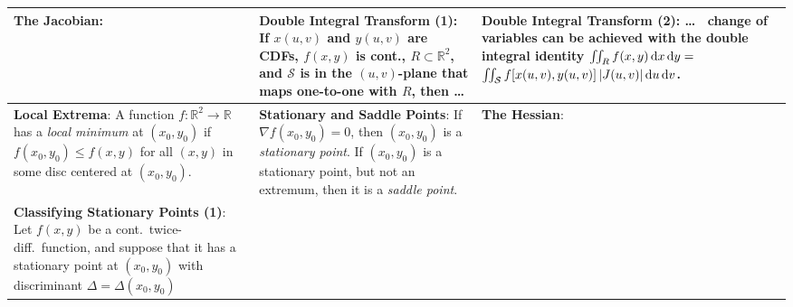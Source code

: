 \begin{tabular}{|m{.31\linewidth}|m{.31\linewidth}|m{.31\linewidth}|}
\hline

\textbf{The Jacobian}:
    \smash{$
        J \coloneqq \det \left(
            \begin{array}{cc}
                \partial x/\partial u &
                \partial x/\partial v \\
                \partial y/\partial u &
                \partial y/\partial v
            \end{array}
        \right)
    $} &

\textbf{Double Integral Transform (1)}:
    If
        $ x(u, v) $ and
        $ y(u, v) $ are CDFs,
        $ f(x, y) $ is cont.,
        $ R \subset \mathbb{R}^2 $, and
        $ \mathcal{S} $ is in the $ (u, v) $-plane that maps one-to-one with
            $ R $,
    then \ldots&

\textbf{Double Integral Transform (2)}: \ldots\ %
    change of variables can be achieved with the double integral identity
    $ \iint_R f(x, y)
        \,\mathrm{d}x \,\mathrm{d}y = $
    $ \iint_\mathcal{S}
        f[ x(u, v), y(u, v) ]\,
        \vert J(u, v) \vert
        \,\mathrm{d}u\,\mathrm{d}v $. \\

\hline

\textbf{Local Extrema}:
    A function $ f \colon \mathbb{R}^2 \to \mathbb{R} $ has a \emph{local
    minimum} at $ (x_0, y_0) $ if $ f(x_0, y_0) \leq f(x, y) $ for all $ (x, y)
    $ in some disc centered at $ ( x_0, y_0 ) $. &

\textbf{Stationary and Saddle Points}:
    If
        $ \nabla f(x_0, y_0) = 0 $,
    then
        $ (x_0, y_0) $ is a \emph{stationary point}.
    If $ (x_0, y_0) $ is a stationary point, but not an extremum, then it is a
    \emph{saddle point}. &

\textbf{The Hessian}:
    \smash{$
        H(x, y) \coloneqq \left(
            \begin{array}{cc}
                f_{xx}(x, y) & f_{xy}(x, y) \\
                f_{yx}(x, y) & f_{yy}(x, y)
            \end{array}
        \right)
    $} \\

\hline

\textbf{Classifying Stationary Points (1)}:
    Let $ f(x, y) $ be a cont.\ twice-diff.\ function, and suppose that
    it has a stationary point at $ (x_0, y_0) $ with discriminant $ \Delta =
    \Delta (x_0, y_0) $ &


\end{tabular}
